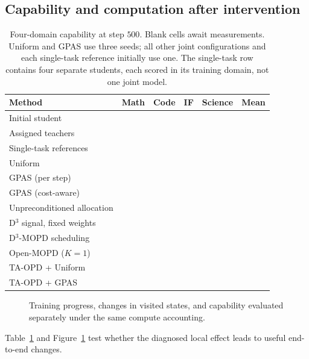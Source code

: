 \subsection{Capability and computation after intervention}

\begin{table}[t]
\centering
\small
\setlength{\tabcolsep}{4pt}
\caption{Four-domain capability at step $500$. Blank cells await measurements.
Uniform and GPAS use three seeds; all other joint configurations and each
single-task reference initially use one. The single-task row contains four
separate students, each scored in its training domain, not one joint model.}
\label{tab:main_results}
\begin{tabular}{lccccc}
\toprule
Method & Math & Code & IF & Science & Mean \\
\midrule
Initial student & & & & & \\
Assigned teachers & & & & & \\
Single-task references & & & & & \\
\midrule
Uniform & & & & & \\
GPAS (per step) & & & & & \\
\midrule
GPAS (cost-aware) & & & & & \\
Unpreconditioned allocation & & & & & \\
D$^3$ signal, fixed weights & & & & & \\
D$^3$-MOPD scheduling & & & & & \\
Open-MOPD ($K=1$) & & & & & \\
TA-OPD + Uniform & & & & & \\
TA-OPD + GPAS & & & & & \\
\bottomrule
\end{tabular}
\end{table}

\begin{figure}[t]
    \centering
    \caption{Training progress, changes in visited states, and capability
    evaluated separately under the same compute accounting.}
    \label{fig:training_efficiency}
\end{figure}

Table~\ref{tab:main_results} and Figure~\ref{fig:training_efficiency} test
whether the diagnosed local effect leads to useful end-to-end changes.

